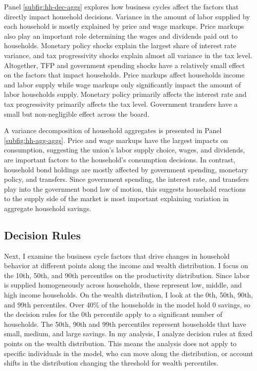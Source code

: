 Panel \ref{subfig:hh-dec-aggs} explores how business cycles affect the factors that directly impact household decisions. Variance in the amount of labor supplied by each household is mostly explained by price and wage markups. Price markups also play an important role determining the wages and dividends paid out to households. Monetary policy shocks explain the largest share of interest rate variance, and tax progressivity shocks explain almost all variance in the tax level. Altogether, TFP and government spending shocks have a relatively small effect on the factors that impact households. Price markups affect households income and labor supply while wage markups only significantly impact the amount of labor households supply. Monetary policy primarily affects the interest rate and tax progressivity primarily affects the tax level. Government transfers have a small but non-negligible effect across the board.

A variance decomposition of household aggregates is presented in Panel \ref{subfig:hh-agg-aggs}. Price and wage markups have the largest impacts on consumption, suggesting the union's labor supply choice, wages, and dividends, are important factors to the household's consumption decisions. In contrast, household bond holdings are mostly affected by government spending, monetary policy, and transfers. Since government spending, the interest rate, and transfers play into the government bond law of motion, this suggests household reactions to the supply side of the market is most important explaining variation in aggregate household savings.


\subsection{Decision Rules} \label{subsec:buis-dec-rules}

Next, I examine the business cycle factors that drive changes in household behavior at different points along the income and wealth distribution. I focus on the 10th, 50th, and 90th percentiles on the productivity distribution. Since labor is supplied homogeneously across households, these represent low, middle, and high income households. On the wealth distribution, I look at the 0th, 50th, 90th, and 99th percentiles. Over 40\% of the households in the model hold 0 savings, so the decision rules for the 0th percentile apply to a significant number of households. The 50th, 90th and 99th percentiles represent households that have small, medium, and large savings. In my analysis, I analyze decision rules at fixed points on the wealth distribution. This means the analysis does not apply to specific individuals in the model, who can move along the distribution, or account shifts in the distribution changing the threshold for wealth percentiles.

